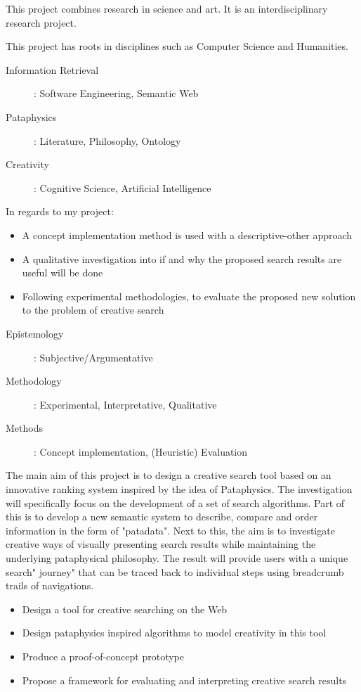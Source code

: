 This project combines research in science and art. It is an interdisciplinary research project.

This project has roots in disciplines such as Computer Science and Humanities.
\begin{description}
  \item [Information Retrieval]: Software Engineering, Semantic Web
  \item [Pataphysics]: Literature, Philosophy, Ontology
  \item [Creativity]: Cognitive Science, Artificial Intelligence
\end{description}

In regards to my project:
\begin{itemize}
  \item A concept implementation method is used with a descriptive-other approach
  \item A qualitative investigation into if and why the proposed search results are useful will be done
  \item Following experimental methodologies, to evaluate the proposed new solution to the problem of creative search
\end{itemize}

\begin{description}
  \item [Epistemology]: Subjective/Argumentative
  \item [Methodology]: Experimental, Interpretative, Qualitative
  \item [Methods]: Concept implementation, (Heuristic) Evaluation
\end{description}

The main aim of this project is to design a creative search tool based on an innovative ranking system inspired by the idea of Pataphysics. The investigation will specifically focus on the development of a set of search algorithms. Part of this is to develop a new semantic system to describe, compare and order information in the form of "patadata". Next to this, the aim is to investigate creative ways of visually presenting search results while maintaining the underlying pataphysical philosophy. The result will provide users with a unique search" journey" that can be traced back to individual steps using breadcrumb trails of navigations.

\begin{itemize}
  \item Design a tool for creative searching on the Web
  \item Design pataphysics inspired algorithms to model creativity in this tool
  \item Produce a proof-of-concept prototype
  \item Propose a framework for evaluating and interpreting creative search results
\end{itemize}


